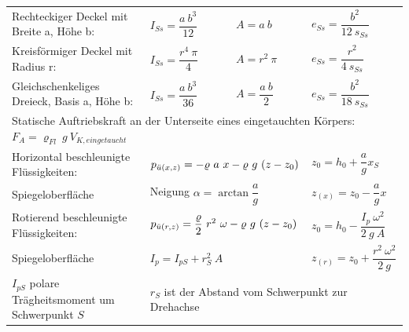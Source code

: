 	\begin{center}
		\setlength{\tabcolsep}{1em} %
		{\renewcommand{\arraystretch}{2}
		\begin{tabular}{llll}
			Rechteckiger Deckel mit Breite a, Höhe b:              & $ I_{Ss} = \dfrac{a\ b^3}{12} $  & $ A = a \ b $                                             & $ e_{Ss} = \dfrac{b^2}{12\ s_{Ss}} $            \\
			Kreisförmiger Deckel mit Radius r:                     & $ I_{Ss} = \dfrac{r^4\ \pi}{4} $ & $ A = r^2 \ \pi $                                         & $ e_{Ss} = \dfrac{r^2}{4\ s_{Ss}} $             \\
			Gleichschenkeliges Dreieck, Basis a, Höhe b:           & $ I_{Ss} = \dfrac{a\ b^3}{36} $  & $ A = \dfrac{a \ b}{2} $                                  & $ e_{Ss} = \dfrac{b^2}{18\ s_{Ss}} $            \\
			\multicolumn{4}{l}{Statische Auftriebskraft an der Unterseite eines eingetauchten Körpers:  $ F_A = \varrho_{Fl} \ g \ V_{K,eingetaucht} $ }                                                            \\
			Horizontal beschleunigte Flüssigkeiten:                & \multicolumn{2}{l}{$ p_{\ue(x,z)} = -\varrho\ a\ x - \varrho\ g\ (z-z_0) $}                  & $ z_0 = h_0 + \dfrac{a}{g} x_S $                \\
			\qquad Spiegeloberfläche                               & \multicolumn{2}{l}{ Neigung $ \alpha = \arctan \dfrac{a}{g} $}                               & $ z_{(x)} = z_0 - \dfrac{a}{g} x $              \\
			Rotierend beschleunigte Flüssigkeiten:                 & \multicolumn{2}{l}{$ p_{\ddot{u}(r,z)} = \dfrac{\varrho}{2}\ r^2\ \omega - \varrho\ g\ (z-z_0) $} & $ z_0 = h_0 - \dfrac{I_p\ \omega^2}{2\ g\ A} $  \\
			\qquad Spiegeloberfläche                               & \multicolumn{2}{l}{$ I_p = I_{pS} + r_S^2\ A $}                                              & $ z_{(r)} = z_0 + \dfrac{r^2\ \omega^2}{2\ g} $ \\
			$ I_{pS} $ polare Trägheitsmoment um Schwerpunkt $ S $ & \multicolumn{3}{l}{$ r_S $ ist der Abstand vom Schwerpunkt zur Drehachse}
		\end{tabular}
		}
	\end{center}

